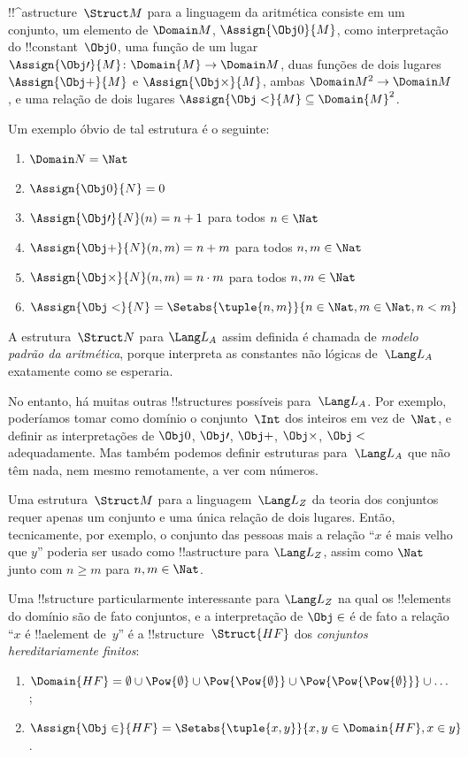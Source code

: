 \documentclass[../../../include/open-logic-section]{subfiles}
\begin{document}
\begin{ex}
!!^a{structure}~$\Struct M$ para a linguagem da aritmética consiste em um
  conjunto, um elemento de $\Domain M$, $\Assign{\Obj 0}{M}$, como
  interpretação do !!{constant}~$\Obj 0$, uma função de um lugar
  $\Assign{\Obj \prime}{M} \colon \Domain{M} \to \Domain M$, duas
  funções de dois lugares $\Assign{\Obj +}{M}$ e $\Assign{\Obj
    \times}{M}$, ambas $\Domain M^2 \to \Domain M$, e uma relação de
  dois lugares $\Assign{\Obj <}{M} \subseteq \Domain{M}^2$.

Um exemplo óbvio de tal estrutura é o seguinte:
\begin{enumerate}
\item $\Domain N = \Nat$
\item $\Assign{\Obj 0}{N} = 0$
\item $\Assign{\Obj \prime}{N}(n) = n + 1$ para todos $n \in \Nat$
\item $\Assign{\Obj +}{N}(n, m) = n + m$ para todos $n, m \in \Nat$
\item $\Assign{\Obj \times}{N}(n, m) = n\cdot m$ para todos $n, m \in \Nat$
\item $\Assign{\Obj <}{N} = \Setabs{\tuple{n, m}}{n \in \Nat, m \in
  \Nat, n < m}$
\end{enumerate}
A estrutura~$\Struct N$ para $\Lang L_A$ assim definida é chamada de
\emph{modelo padrão da aritmética}, porque interpreta as
constantes não lógicas de~$\Lang L_A$ exatamente como se esperaria.

No entanto, há muitas outras !!{structure}s possíveis para~$\Lang
L_A$. Por exemplo, poderíamos tomar como domínio o conjunto~$\Int$ dos
inteiros em vez de~$\Nat$, e definir as interpretações de $\Obj
0$, $\Obj \prime$, $\Obj +$, $\Obj \times$, $\Obj <$ adequadamente.  Mas
também podemos definir estruturas para~$\Lang L_A$ que não têm nada, nem mesmo
remotamente, a ver com números.
\end{ex}

\begin{ex}
Uma estrutura~$\Struct M$ para a linguagem~$\Lang L_Z$ da teoria dos conjuntos requer
apenas um conjunto e uma única relação de dois lugares. Então, tecnicamente, por exemplo, o
conjunto das pessoas mais a relação ``$x$ é mais velho que $y$'' poderia ser
usado como !!a{structure} para $\Lang L_Z$, assim como $\Nat$ junto
com $n \ge m$ para $n, m \in \Nat$.

Uma !!{structure} particularmente interessante para $\Lang L_Z$ na qual os
!!{element}s do domínio são de fato conjuntos, e a interpretação
de $\Obj \in$ é de fato a relação ``$x$ é !!a{element} de~$y$''
é a !!{structure}~$\Struct{{HF}}$ dos \emph{conjuntos hereditariamente finitos}:
\begin{enumerate}
\item $\Domain{{{HF}}} = \emptyset \cup \Pow{\emptyset} \cup
  \Pow{\Pow{\emptyset}} \cup \Pow{\Pow{\Pow{\emptyset}}} \cup \dots$;
\item $\Assign{\Obj \in}{{{HF}}} = \Setabs{\tuple{x, y}}{x, y \in
  \Domain{{{HF}}}, x \in y}$.
\end{enumerate}
\end{ex}
\end{document}
